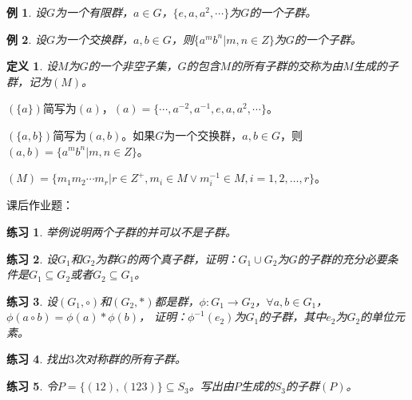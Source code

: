 \documentclass{article}
\newtheorem{Def}{定义}
\newtheorem{Exercise}{练习}
\newtheorem*{Example}{例}
\begin{document}
\begin{CJK*}{UTF8}{gbsn}
\begin{Example}
  设$G$为一个有限群，$a\in G$，$\{e,a,a^2,\cdots\}$为$G$的一个子群。
\end{Example}

\begin{Example}
  设$G$为一个交换群，$a,b\in G$，则$\{a^mb^n|m,n\in Z\}$为$G$的一个子群。
\end{Example}

\begin{Def}
  设$M$为$G$的一个非空子集，$G$的包含$M$的所有子群的交称为由$M$生成的子群，记为$(M)$。
\end{Def}

$(\{a\})$简写为$(a)$，$(a)=\{\cdots,a^{-2},a^{-1},e,a,a^2,\cdots\}$。

$(\{a,b\})$简写为$(a,b)$。如果$G$为一个交换群，$a,b\in G$，则$(a,b)=\{a^mb^n|m,n\in Z\}$。

$(M)=\{m_1m_2\cdots m_r|r\in Z^+,m_i\in M \lor m_i^{-1}\in M,i=1,2,\ldots,r\}$。

课后作业题：
\begin{Exercise}
举例说明两个子群的并可以不是子群。
\end{Exercise}
\begin{Exercise}
  设$G_1$和$G_2$为群$G$的两个真子群，证明：$G_1\cup G_2$为$G$的子群的充分必要条件是$G_1\subseteq G_2$或者$G_2\subseteq G_1$。
\end{Exercise}

\begin{Exercise}
  设$(G_1,\circ)$和$(G_2,*)$都是群，$\phi:G_1\to G_2$，$\forall a,b\in G_1$，$\phi(a\circ b)=\phi(a)*\phi(b)$，
  证明：$\phi^{-1}(e_2)$为$G_1$的子群，其中$e_2$为$G_2$的单位元素。
\end{Exercise}

\begin{Exercise}
  找出$3$次对称群的所有子群。
\end{Exercise}
\begin{Exercise}
  令$P=\{(12),(123)\}\subseteq S_3$。写出由$P$生成的$S_3$的子群$(P)$。
\end{Exercise}
\end{CJK*}
\end{document}
